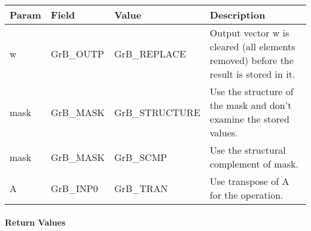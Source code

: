 \begin{itemize}[leftmargin=1.1in]
    \hspace*{-2em}\begin{tabular}{lllp{2.7in}}
        Param & Field  & Value & Description \\
        \hline
        {\sf w}    & {\sf GrB\_OUTP} & {\sf GrB\_REPLACE} & Output vector {\sf w}
        is cleared (all elements removed) before the result is stored in it.\\

        {\sf mask} & {\sf GrB\_MASK} & {\sf GrB\_STRUCTURE}   & Use the structure
        of the {\sf mask} and don't examine the stored values.\\

        {\sf mask} & {\sf GrB\_MASK} & {\sf GrB\_SCMP}   & Use the structural
        complement of {\sf mask}. \\

        {\sf A}    & {\sf GrB\_INP0} & {\sf GrB\_TRAN}   & Use transpose of {\sf A}
        for the operation. \\
    \end{tabular}
\end{itemize}

\paragraph{Return Values}

